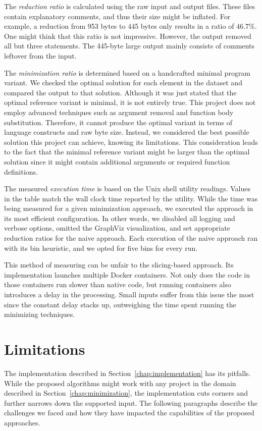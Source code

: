 The \emph{reduction ratio} is calculated using the raw input and output 
files. 
These files contain explanatory comments, and thus their size might be 
inflated. 
For example, a reduction from 953 bytes to 445 bytes only results in a ratio 
of $46.7\%$. 
One might think that this ratio is not impressive. 
However, the output removed all but three statements. 
The 445-byte large output mainly consists of comments leftover from the input.

The \emph{minimization ratio} is determined based on a handcrafted minimal 
program variant. 
We checked the optimal solution for each element in the dataset and compared 
the output to that solution. 
Although it was just stated that the optimal reference variant is minimal, 
it is not entirely true. 
This project does not employ advanced techniques such as argument removal 
and function body substitution. 
Therefore, it cannot produce the optimal variant in terms of language 
constructs and raw byte size. 
Instead, we considered the best possible solution this project can achieve, 
knowing its limitations. 
This consideration leads to the fact that the minimal reference variant 
might be larger than the optimal solution since it might contain additional 
arguments or required function definitions.

The measured \emph{execution time} is based on the  Unix shell 
utility readings. 
Values in the table match the wall clock time reported by the utility. 
While the time was being measured for a given minimization approach, we 
executed the approach in its most efficient configuration. 
In other words, we disabled all logging and verbose options, omitted 
the GraphViz visualization, and set appropriate reduction ratios for 
the naive approach. 
Each execution of the naive approach ran with its bin heuristic, and we 
opted for five bins for every run. 

This method of measuring can be unfair to the slicing-based approach. 
Its implementation launches multiple Docker containers. 
Not only does the code in those containers run slower than native code, 
but running containers also introduces a delay in the processing. 
Small inputs suffer from this issue the most since the constant delay stacks 
up, outweighing the time spent running the minimizing techniques.

\section{Limitations}
The implementation described in Section~\ref{chap:implementation} has its 
pitfalls. 
While the proposed algorithms might work with any project in the domain 
described in Section~\ref{chap:minimization}, the implementation cuts corners 
and further narrows down the supported input. 
The following paragraphs describe the challenges we faced and how they have 
impacted the capabilities of the proposed approaches.

